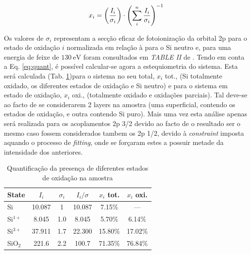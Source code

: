 \documentclass[baaa]{baaa}
\begin{document}
\begin{gather}
  x_i= \qty(\frac{I_i}{\sigma_i})\cdot\qty(\sum_i^n \frac{I_i}{\sigma_i})^{-1}
  \label{eq:quant}
\end{gather}

Os valores de $\sigma_i$ representam a secção eficaz de fotoionização da orbital 2p para o estado de oxidação $i$ normalizada em relação à para o Si neutro e, para uma energia de feixe de $130\ \si{\electronvolt}$ foram consultados em \textit{TABLE II} de \cite{Himpsel}. Tendo em conta a Eq. \ref{eq:quant}, é possível calcular-se agora a estequiometria do sistema. Esta será calculada (Tab. \ref{table:esteq})para o sistema no seu total, $x_i$ tot., (Si totalmente oxidado, os diferentes estados de oxidação e Si neutro) e para o sistema em estado de oxidação, $x_i$ oxi., (totalmente oxidado e oxidações parciais). Tal deve-se ao facto de se considerarem 2 layers na amostra (uma superficial, contendo os estados de oxidação, e outra contendo Si puro). Mais uma vez esta análise apenas será realizada para os acoplamentos 2p 3/2 devido ao facto de o resultado ser o mesmo caso fossem considerados tambem os 2p 1/2, devido à \textit{constraint} imposta aquando o processo de \textit{fitting}, onde se forçaram estes a possuir metade da intensidade dos anteriores.




\begin{table}[h!]
  \centering
  \caption{Quantificação da presença de diferentes estados de oxidação na amostra}
  \begin{tabular}{lccccc}
    \hline\hline\noalign{\smallskip}
    State & $I_i$ &$\sigma_i$& $I_i/\sigma$& $x_i$ tot.&$x_i$ oxi.\\
    \hline\noalign{\smallskip}
    Si &10.087&1& 10.087&7.15\%&---\\
    Si$^{1+}$&8.045&1.0& 8.045 &5.70\% &6.14\%\\
    Si$^{3+}$&37.911&1.7&22.300&15.80\%&17.02\%\\
    SiO$_2$ &221.6&2.2&100.7&71.35\%&76.84\%\\
    \hline
    \end{tabular}
    \label{table:esteq}
\end{table}










\small

 
\end{document}
